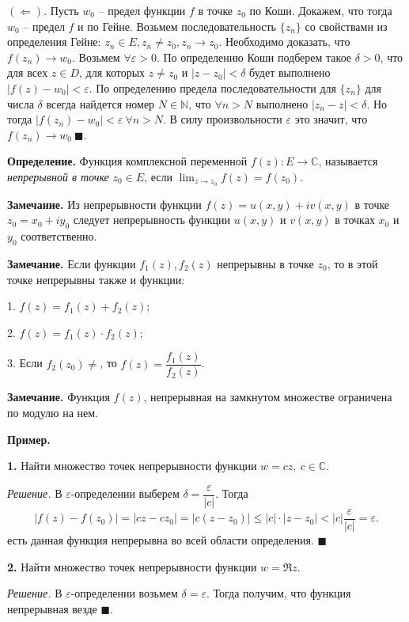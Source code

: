 \documentclass[9pt]{article}
\begin{document}
\par\((\Leftarrow)\). Пусть \(w_0\) -- предел функции \(f\) в точке \(z_0\) по Коши. Докажем, что тогда \(w_0\) -- предел \(f\) и по Гейне. Возьмем последовательность \(\{z_n\}\) со свойствами из определения Гейне: \(z_n\in E, z_n\neq z_0, z_n\to z_0\). Необходимо доказать, что \(f(z_n)\to w_0\). Возьмем \(\forall \varepsilon>0\). По определению Коши подберем такое \(\delta>0\), что для всех \(z\in D\), для которых \(z\neq z_0\) и \(|z-z_0|<\delta\) будет выполнено \(|f(z)-w_0|<\varepsilon\). По определению предела последовательности для \(\{z_n\}\) для числа \(\delta\) всегда найдется номер \(N\in\mathbb N\), что \(\forall n>N\) выполнено \(|z_n-z|<\delta\). Но тогда \(|f(z_n)-w_0|<\varepsilon\ \forall n>N\). В силу произвольности \(\varepsilon\) это значит, что \(f(z_n)\to w_0\ \blacksquare\). 
\par\textbf{Определение.} Функция комплексной переменной \(f(z):E\to\mathbb C\), называется \textit{непрерывной в точке} \(z_0\in E\), если \(\displaystyle\lim_{z\to z_0}f(z)=f(z_0)\).
\par\textbf{Замечание.} Из непрерывности функции \(f(z)=u(x,y)+iv(x,y)\) в точке \(z_0=x_0+iy_0\) следует непрерывность функции \(u(x,y)\) и \(v(x,y)\) в точках \(x_0\) и \(y_0\) соответственно. 
\par\textbf{Замечание.} Если функции \(f_1(z), f_2(z)\) непрерывны в точке \(z_0\), то в этой точке непрерывны также и функции:
\par1. \(f(z)=f_1(z)+f_2(z)\);
\par2. \(f(z)=f_1(z)\cdot f_2(z)\);
\par3. Если \(f_2(z_0)\neq\), то \(f(z)=\dfrac{f_1(z)}{f_2(z)}\).
\par\textbf{Замечание.} Функция \(f(z)\), непрерывная на замкнутом множестве ограничена по модулю на нем.
\par\textbf{Пример.}
\par\textbf{1.} Найти множество точек непрерывности функции \(w=cz,\ c\in\mathbb C\).
\par\textit{Решение.} В \(\varepsilon\)-определении выберем \(\delta=\dfrac{\varepsilon}{|c|}\). Тогда \[|f(z)-f(z_0)|=|cz-cz_0|=|c(z-z_0)|\leq|c|\cdot|z-z_0|<|c|\dfrac{\varepsilon}{|c|}=\varepsilon.\]
 есть данная функция непрерывна во всей области определения. \(\blacksquare\)
\par\textbf{2.} Найти множество точек непрерывности функции \(w=\Re z.\)
\par\textit{Решение.} В \(\varepsilon\)-определении возьмем \(\delta=\varepsilon.\) Тогда получим, что функция непрерывная везде \(\blacksquare\).
\end{document}
